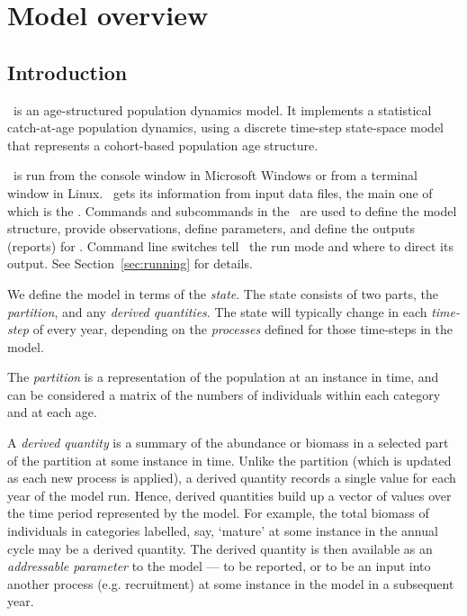 \section{Model overview\label{sec:overview}}

\subsection{Introduction}

\CNAME\ is an age-structured population dynamics model. It implements a statistical catch-at-age population dynamics, using a discrete time-step state-space model that represents a cohort-based population age structure.  

\CNAME\ is run from the console window in Microsoft Windows or from a terminal window in Linux. \CNAME\ gets its information from input data files, the main one of which is the \emph{\config}. Commands and subcommands in the \config\ are used to define the model structure, provide observations, define parameters, and define the outputs (reports) for \CNAME. Command line switches tell \CNAME\ the run mode and where to direct its output. See Section~\ref{sec:running} for details.

We define the model in terms of the \emph{state}. The state consists of two parts, the \emph{partition}, and any \emph{derived quantities}. The state will typically change in each \emph{time-step} of every year, depending on the \emph{processes} defined for those time-steps in the model. 

The \emph{partition} is a representation of the population at an instance in time, and can be considered a matrix of the numbers of individuals within each category and at each age. 

A \emph{derived quantity} is a summary of the abundance or biomass in a selected part of the partition at some instance in time. Unlike the partition (which is updated as each new process is applied), a derived quantity records a single value for each year of the model run. Hence, derived quantities build up a vector of values over the time period represented by the model. For example, the total biomass of individuals in categories labelled, say, `mature' at some instance in the annual cycle may be a derived quantity. The derived quantity is then available as an \emph{addressable parameter} to the model --- to be reported, or to be an input into another process (e.g. recruitment) at some instance in the model in a subsequent year. 

